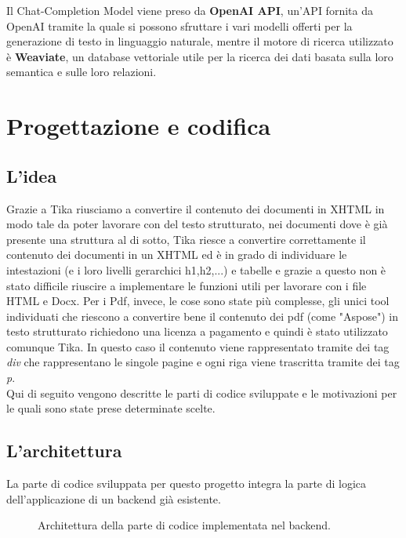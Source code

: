 Il Chat-Completion Model viene preso da \textbf{OpenAI API}, un'API fornita da OpenAI tramite la quale si possono sfruttare i vari modelli offerti per la generazione di testo in linguaggio naturale, mentre il motore di ricerca utilizzato 
è \textbf{Weaviate}, un database vettoriale utile per la ricerca dei dati basata sulla loro semantica e sulle loro relazioni. 

\section{Progettazione e codifica}

\subsection{L'idea}
\label{subsec:ideaProg}
Grazie a Tika riusciamo a convertire il contenuto dei documenti in XHTML in modo tale da poter lavorare con del testo strutturato,
nei documenti dove è già presente una struttura al di sotto, Tika riesce a convertire correttamente il contenuto dei documenti in un XHTML ed è in grado di individuare le intestazioni (e i loro livelli gerarchici h1,h2,...) e tabelle e grazie a questo non è stato difficile riuscire a implementare le funzioni utili per lavorare con i file HTML e Docx.
Per i Pdf, invece, le cose sono state più complesse, gli unici tool individuati che riescono a convertire bene il contenuto dei pdf (come "Aspose") in testo strutturato richiedono una licenza a pagamento e quindi è stato utilizzato comunque Tika.
In questo caso il contenuto viene rappresentato tramite dei tag \emph{div} che rappresentano le singole pagine e ogni riga viene trascritta tramite dei tag \emph{p}. \\

\noindent Qui di seguito vengono descritte le parti di codice sviluppate e le motivazioni per le quali sono state prese determinate scelte.

\subsection{L'architettura}

\label{sec:progettazione-codifica}
La parte di codice sviluppata per questo progetto integra la parte di logica dell'applicazione di un backend già esistente.

\begin{figure}[!h]
    \centering
    \caption{Architettura della parte di codice implementata nel backend.}
\end{figure}

